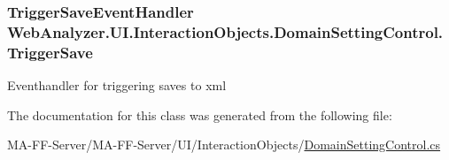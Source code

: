 \subsubsection[{Trigger\+Save}]{\setlength{\rightskip}{0pt plus 5cm}Trigger\+Save\+Event\+Handler Web\+Analyzer.\+U\+I.\+Interaction\+Objects.\+Domain\+Setting\+Control.\+Trigger\+Save}\label{class_web_analyzer_1_1_u_i_1_1_interaction_objects_1_1_domain_setting_control_a1daa9c774e823427b39110bc42ff0ccd}


Eventhandler for triggering saves to xml 



The documentation for this class was generated from the following file\+:\begin{DoxyCompactItemize}
\item 
M\+A-\/\+F\+F-\/\+Server/\+M\+A-\/\+F\+F-\/\+Server/\+U\+I/\+Interaction\+Objects/\hyperlink{_domain_setting_control_8cs}{Domain\+Setting\+Control.\+cs}\end{DoxyCompactItemize}
